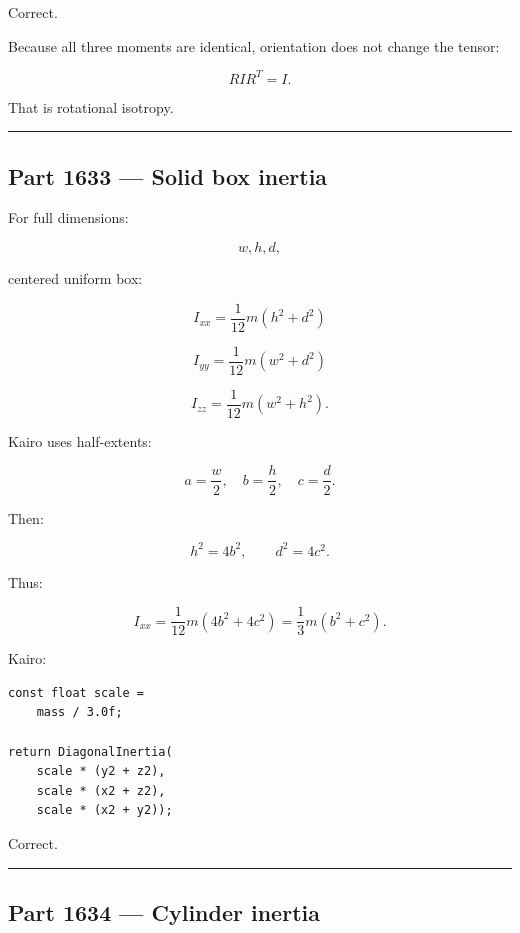 Correct.

Because all three moments are identical, orientation does not change the tensor:

\[
RI R^T=I.
\]

That is rotational isotropy.

\begin{center}\rule{0.5\linewidth}{0.5pt}\end{center}

\subsection{Part 1633 --- Solid box inertia}\label{06-engine-ii-ch035-part-1633-solid-box-inertia}

\hypertarget{06-engine-ii-ch035-part-1633-solid-box-inertia}{}

For full dimensions:

\[
w,h,d,
\]

centered uniform box:

\[
I_{xx}
=
\frac{1}{12}m(h^2+d^2)
\]

\[
I_{yy}
=
\frac{1}{12}m(w^2+d^2)
\]

\[
I_{zz}
=
\frac{1}{12}m(w^2+h^2).
\]

Kairo uses half-extents:

\[
a=\frac w2,\quad
b=\frac h2,\quad
c=\frac d2.
\]

Then:

\[
h^2=4b^2,\qquad
d^2=4c^2.
\]

Thus:

\[
I_{xx}
=
\frac{1}{12}m(4b^2+4c^2)
=
\frac13m(b^2+c^2).
\]

Kairo:

\begin{verbatim}
const float scale =
    mass / 3.0f;

return DiagonalInertia(
    scale * (y2 + z2),
    scale * (x2 + z2),
    scale * (x2 + y2));
\end{verbatim}

Correct.

\begin{center}\rule{0.5\linewidth}{0.5pt}\end{center}

\subsection{Part 1634 --- Cylinder inertia}\label{06-engine-ii-ch035-part-1634-cylinder-inertia}

